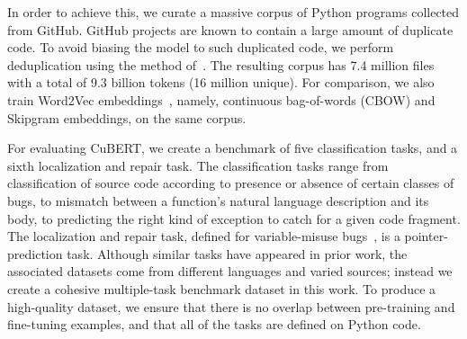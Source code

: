 \documentclass{article}
\newcommand{\BERTforCode}{CuBERT\xspace}
\newcommand{\update}[1]{#1}
\begin{document}
In order to achieve this, we curate a massive corpus of Python programs collected from GitHub. GitHub projects are known to contain a large amount of duplicate code. To avoid biasing the model to such duplicated code, we perform deduplication using the method of~\citet{DBLP:journals/corr/abs-1812-06469}. The resulting corpus has \update{\num{7.4}} million files with a total of \update{\num{9.3} billion tokens} (\num{16} million unique). For comparison, we also train Word2Vec embeddings~\citep{DBLP:journals/corr/abs-1301-3781,NIPS2013_5021}, namely, continuous bag-of-words (CBOW) and Skipgram embeddings, on the same corpus.

For evaluating \BERTforCode, we create a benchmark of five classification tasks, and a sixth localization and repair task. The classification tasks range from classification of source code according to presence or absence of certain classes of bugs, to mismatch between a function's natural language description and its body, to predicting the right kind of exception to catch for a given code fragment. The localization and repair task, defined for variable-misuse bugs~\citep{DBLP:journals/corr/abs-1904-01720}, is a pointer-prediction task.
Although similar tasks have appeared in prior work, the associated datasets come from different languages and varied sources; instead we create a cohesive multiple-task benchmark dataset in this work. To produce a high-quality dataset, we ensure that there is no overlap between pre-training and fine-tuning examples, and that all of the tasks are defined on Python code.
\end{document}
